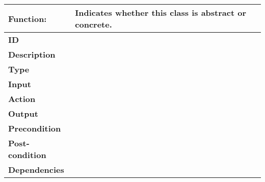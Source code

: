 \documentclass[]{article}
\begin{document}
\FloatBarrier
\begin{table}[h]
\caption{}
\label{tab:my-table}
\begin{tabular}{|p{}|p{}|}
\hline
\textbf{Function:} & Indicates whether this class is abstract or concrete.
\\ \hline
\textbf{ID}  &            

\\ \hline
\textbf{Description}    &                                                                     
\\ \hline
\textbf{Type}    &         

\\ \hline
\textbf{Input}        & 


\\ \hline
\textbf{Action}            & 

\\ \hline
\textbf{Output}            & 

\\ \hline
\textbf{Precondition}           &   

\\ \hline
\textbf{Post-condition}           & 


\\ \hline
\textbf{Dependencies}           & 
\\ \hline
\end{tabular}
\end{table}
\FloatBarrier
\end{document}
